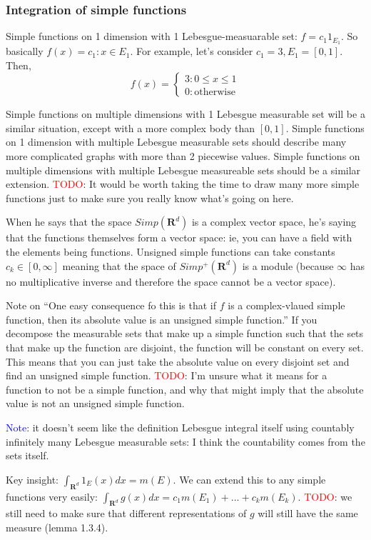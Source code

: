 \documentclass[answers,12pt]{exam}
\begin{document}
\subsubsection{Integration of simple functions}
Simple functions on 1 dimension with 1 Lebesgue-measuarable set: $f=c_1 1_{E_1}$.
So basically $f(x) = c_1: x \in E_1$.
For example, let's consider $c_1 =3, E_1 = [0,1]$.
Then, \[f(x) = \begin{cases}
    3: 0 \leq x \leq 1 \\
    0: \text{otherwise}
\end{cases}\]

Simple functions on multiple dimensions with 1 Lebesgue measurable set will be a similar situation, except with a more complex body than $[0,1]$.
Simple functions on 1 dimension with multiple Lebesgue measurable sets should describe many more complicated graphs with more than 2 piecewise values.
Simple functions on multiple dimensions with multiple Lebesgue measureable sets should be a similar extension.
\textcolor{red}{TODO}: It would be worth taking the time to draw many more simple functions just to make sure you really know what's going on here.

When he says that the space $Simp(\mathbf{R}^d)$ is a complex vector space, he's saying that the functions themselves form a vector space: ie, you can have a field with the elements being functions.
Unsigned simple functions can take constants $c_k \in [0, \infty]$ meaning that the space of $Simp^{+}(\mathbf{R}^d)$ is a module (because $\infty$ has no multiplicative inverse and therefore the space cannot be a vector space).

Note on ``One easy consequence fo this is that if $f$ is a complex-vlaued simple function, then its absolute value is an unsigned simple function.''
If you decompose the measurable sets that make up a simple function such that the sets that make up the function are disjoint, the function will be constant on every set.
This means that you can just take the absolute value on every disjoint set and find an unsigned simple function.
\textcolor{red}{TODO}: I'm unsure what it means for a function to not be a simple function, and why that might imply that the absolute value is not an unsigned simple function.

\textcolor{blue}{Note}: it doesn't seem like the definition Lebesgue integral itself using countably infinitely many Lebesgue measurable sets: I think the countability comes from the sets itself.

Key insight: $\int_{\mathbf{R}^d}1_E(x)dx = m(E)$.
We can extend this to any simple functions very easily: $\int_{\mathbf{R}^d} g(x) dx = c_1 m(E_1) + ... + c_k m(E_k)$.
\textcolor{red}{TODO}: we still need to make sure that different representations of $g$ will still have the same measure (lemma 1.3.4).
\end{document}

